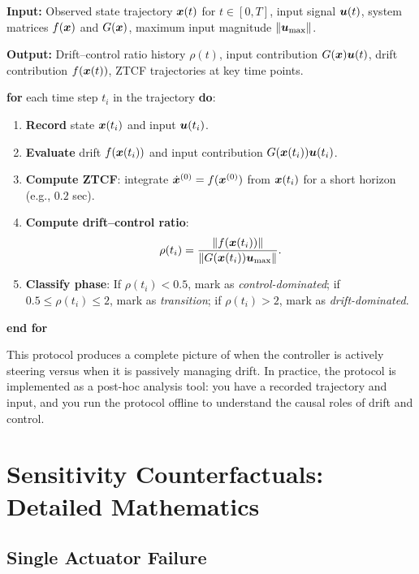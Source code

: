 \begin{algorithm}[h!]
\caption{Drift--Control Attribution Protocol}
\label{alg:ch7:attribution}

\textbf{Input:} Observed state trajectory $\bm{x}(t)$ for $t\in[0,T]$, input signal $\bm{u}(t)$,
system matrices $f(\bm{x})$ and $G(\bm{x})$, maximum input magnitude $\left\lVert \bm{u}_{\max} \right\rVert$.

\textbf{Output:} Drift--control ratio history $\rho(t)$, input contribution $G(\bm{x})\bm{u}(t)$,
drift contribution $f(\bm{x}(t))$, ZTCF trajectories at key time points.

\vspace{0.2cm}
\textbf{for} each time step $t_i$ in the trajectory \textbf{do}:
\begin{enumerate}
    \item \textbf{Record} state $\bm{x}(t_i)$ and input $\bm{u}(t_i)$.
    \item \textbf{Evaluate} drift $f(\bm{x}(t_i))$ and input contribution $G(\bm{x}(t_i))\bm{u}(t_i)$.
    \item \textbf{Compute ZTCF}: integrate $\dot{\bm{x}}^{(0)} = f(\bm{x}^{(0)})$ from $\bm{x}(t_i)$ for a short horizon (e.g., $0.2$ sec).
    \item \textbf{Compute drift--control ratio}:
    \begin{equation*}
    \rho(t_i) = \frac{\left\lVert f(\bm{x}(t_i)) \right\rVert}{\left\lVert G(\bm{x}(t_i))\bm{u}_{\max} \right\rVert}.
    \end{equation*}
    \item \textbf{Classify phase}: If $\rho(t_i) < 0.5$, mark as \textit{control-dominated};
    if $0.5 \le \rho(t_i) \le 2$, mark as \textit{transition}; if $\rho(t_i) > 2$, mark as \textit{drift-dominated}.
\end{enumerate}
\textbf{end for}
\end{algorithm}

\noindent This protocol produces a complete picture of when the controller is actively
steering versus when it is passively managing drift. In practice, the protocol is
implemented as a post-hoc analysis tool: you have a recorded trajectory and input, and
you run the protocol offline to understand the causal roles of drift and control.

\section{Sensitivity Counterfactuals: Detailed Mathematics}

\subsection{Single Actuator Failure}

